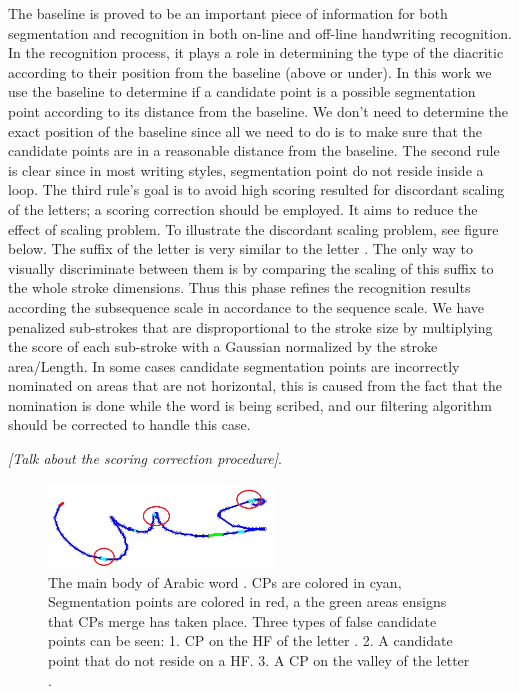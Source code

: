 \documentclass[journal,compsoc]{IEEEtran}
\begin{document}
The baseline is proved to be an important piece of information for both segmentation and recognition in both on-line and off-line handwriting recognition. In the recognition process, it plays a role in determining the type of the diacritic according to their position from the baseline (above or under). In this work we use the baseline to determine if a candidate point is a possible segmentation point according to its distance from the baseline. We don't need to determine the exact position of the baseline since all we need to do is to make sure that the candidate points are in a reasonable distance from the baseline.
The second rule is clear since in most writing styles, segmentation point do not reside inside a loop.
The third rule's goal is to avoid high scoring resulted for discordant scaling of the letters; a scoring correction should be employed. It aims to reduce the effect of scaling problem. To illustrate the discordant scaling problem, see figure below. The suffix of the letter  is very similar to the letter . The only way to visually discriminate between them is by comparing the scaling of this suffix to the whole stroke dimensions. Thus this phase refines the recognition results according the subsequence scale in accordance to the sequence scale. We have penalized sub-strokes that are disproportional to the stroke size by multiplying the score of each sub-stroke with a Gaussian normalized by the stroke area/Length.
In some cases candidate segmentation points are incorrectly nominated on areas that are not horizontal, this is caused from the fact that the nomination is done while the word is being scribed, and our filtering algorithm should be corrected to handle this case.

\emph{[Talk about the scoring correction procedure]}.

\begin{figure}
\centering
\includegraphics[width=6cm]{./figures/candidate_in_no_horizontal}
\caption{The main body of Arabic word . CPs are colored in cyan, Segmentation points are colored in red, a the green areas ensigns that CPs merge has taken place. Three types of false candidate points can be seen: 1. CP on the HF of the letter . 2. A candidate point that do not reside on a HF. 3. A CP on the valley of the letter . }
\label{fig:candidate_in_no_horizontal}
\end{figure}
\end{document}

